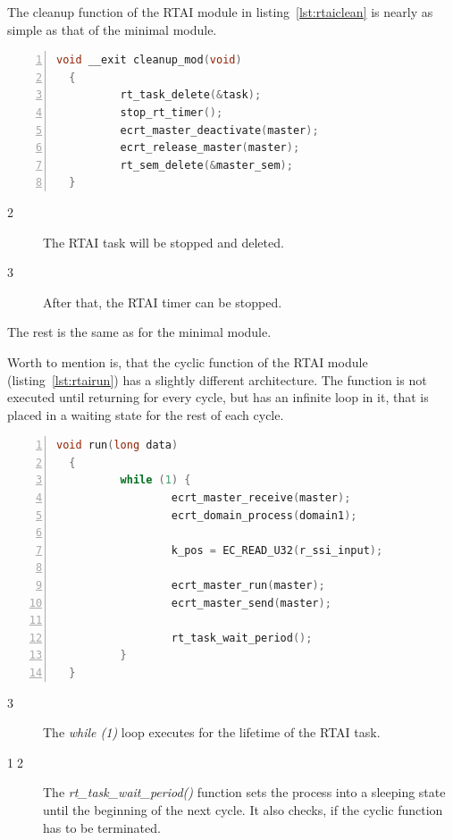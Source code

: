 \documentclass[a4paper,12pt,BCOR6mm,bibtotoc,idxtotoc]{scrbook}
\begin{document}
The cleanup function of the RTAI module in listing~\ref{lst:rtaiclean}
is nearly as simple as that of the minimal module.

\begin{lstlisting}[language=C,numbers=left,caption={RTAI module
    cleanup function},label={lst:rtaiclean}]
  void __exit cleanup_mod(void)
  {
          rt_task_delete(&task);
          stop_rt_timer();
          ecrt_master_deactivate(master);
          ecrt_release_master(master);
          rt_sem_delete(&master_sem);
  }
\end{lstlisting}

\begin{description}
\item[\normalfont\textcircled{\tiny 2}] The RTAI task will be stopped
  and deleted.
\item[\normalfont\textcircled{\tiny 3}] After that, the RTAI timer can
  be stopped.
\end{description}

The rest is the same as for the minimal module.

Worth to mention is, that the cyclic function of the RTAI module
(listing~\ref{lst:rtairun}) has a slightly different architecture. The
function is not executed until returning for every cycle, but has an
infinite loop in it, that is placed in a waiting state for the rest of
each cycle.

\begin{lstlisting}[language=C,numbers=left,caption={RTAI module cyclic
    function},label={lst:rtairun}]
  void run(long data)
  {
          while (1) {
                  ecrt_master_receive(master);
                  ecrt_domain_process(domain1);

                  k_pos = EC_READ_U32(r_ssi_input);

                  ecrt_master_run(master);
                  ecrt_master_send(master);

                  rt_task_wait_period();
          }
  }
\end{lstlisting}

\begin{description}
\item[\normalfont\textcircled{\tiny 3}] The \textit{while (1)} loop
  executes for the lifetime of the RTAI task.
\item[\normalfont\textcircled{\tiny 12}] The
  \textit{rt\_task\_wait\_period()} function sets the process into a
  sleeping state until the beginning of the next cycle. It also
  checks, if the cyclic function has to be terminated.
\end{description}
\end{document}
